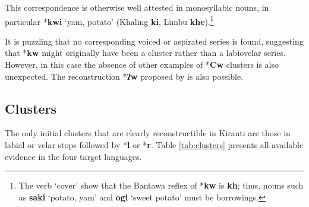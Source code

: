 \documentclass[oldfontcommands,oneside,a4paper,11pt]{article}
\newcommand{\ipa}[1]{\textbf{{\phon\mbox{#1}}}} %
\begin{document}
 This correspondence is otherwise well attested in monosyllabic nouns, in particular *\ipa{kwi} `yam, potato' (Khaling \ipa{ki}, Limbu \ipa{khe}).\footnote{The verb `cover' show that the Bantawa reflex of *\ipa{kw} is \ipa{kh}; thus, nouns such as \ipa{saki} `potato, yam' and \ipa{ogi} `sweet potato' must be borrowings.}

It is puzzling that no corresponding voiced or aspirated series is found, suggesting that *\ipa{kw} might originally have been a cluster rather than a labiovelar series. However, in this case the absence of other examples of *\ipa{Cw} clusters is also unexpected. The reconstruction *\ipa{ʔw} proposed by \citet{michailovsky94stops} is also possible.

\subsection{Clusters} \label{sec:clusters}
The only initial clusters that are clearly reconstructible in Kiranti are those in labial or velar stops followed by *\ipa{l} or *\ipa{r}. Table \ref{tab:clusters} presents all available evidence in the four target languages.
\end{document}
